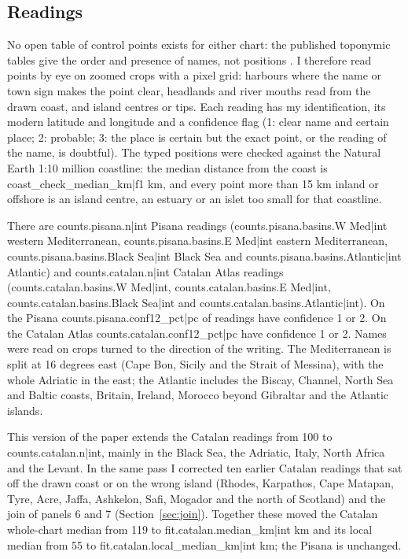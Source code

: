 \documentclass[11pt,a4paper]{article}
\begin{document}
\subsection{Readings}
No open table of control points exists for either chart: the published toponymic tables give the order and presence of names, not positions \citep{campbell1987,pujades2007}. I therefore read points by eye on zoomed crops with a pixel grid: harbours where the name or town sign makes the point clear, headlands and river mouths read from the drawn coast, and island centres or tips. Each reading has my identification, its modern latitude and longitude and a confidence flag (1: clear name and certain place; 2: probable; 3: the place is certain but the exact point, or the reading of the name, is doubtful). The typed positions were checked against the Natural Earth 1:10 million coastline: the median distance from the coast is {{coast_check_median_km|f1}} km, and every point more than 15 km inland or offshore is an island centre, an estuary or an islet too small for that coastline.

There are {{counts.pisana.n|int}} Pisana readings ({{counts.pisana.basins.W Med|int}} western Mediterranean, {{counts.pisana.basins.E Med|int}} eastern Mediterranean, {{counts.pisana.basins.Black Sea|int}} Black Sea and {{counts.pisana.basins.Atlantic|int}} Atlantic) and {{counts.catalan.n|int}} Catalan Atlas readings ({{counts.catalan.basins.W Med|int}}, {{counts.catalan.basins.E Med|int}}, {{counts.catalan.basins.Black Sea|int}} and {{counts.catalan.basins.Atlantic|int}}). On the Pisana {{counts.pisana.conf12_pct|pc}} of readings have confidence 1 or 2. On the Catalan Atlas {{counts.catalan.conf12_pct|pc}} have confidence 1 or 2. Names were read on crops turned to the direction of the writing. The Mediterranean is split at 16 degrees east (Cape Bon, Sicily and the Strait of Messina), with the whole Adriatic in the east; the Atlantic includes the Biscay, Channel, North Sea and Baltic coasts, Britain, Ireland, Morocco beyond Gibraltar and the Atlantic islands.

This version of the paper extends the Catalan readings from 100 to {{counts.catalan.n|int}}, mainly in the Black Sea, the Adriatic, Italy, North Africa and the Levant. In the same pass I corrected ten earlier Catalan readings that sat off the drawn coast or on the wrong island (Rhodes, Karpathos, Cape Matapan, Tyre, Acre, Jaffa, Ashkelon, Safi, Mogador and the north of Scotland) and the join of panels 6 and 7 (Section~\ref{sec:join}). Together these moved the Catalan whole-chart median from 119 to {{fit.catalan.median_km|int}} km and its local median from 55 to {{fit.catalan.local_median_km|int}} km; the Pisana is unchanged.
\end{document}
